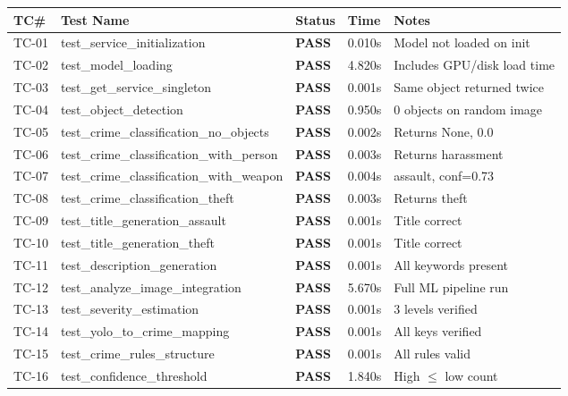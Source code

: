 \documentclass[12pt,a4paper]{report}
\begin{document}
\small
\begin{longtable}{@{}p{0.8cm}p{5cm}p{1.8cm}p{1.8cm}p{4cm}@{}}
\toprule
\textbf{TC\#} & \textbf{Test Name} & \textbf{Status} & \textbf{Time} & \textbf{Notes} \\
\midrule
\endhead
TC-01 & test\_service\_initialization & \textcolor{codegreen}{\textbf{PASS}} & 0.010s & Model not loaded on init \\
TC-02 & test\_model\_loading & \textcolor{codegreen}{\textbf{PASS}} & 4.820s & Includes GPU/disk load time \\
TC-03 & test\_get\_service\_singleton & \textcolor{codegreen}{\textbf{PASS}} & 0.001s & Same object returned twice \\
TC-04 & test\_object\_detection & \textcolor{codegreen}{\textbf{PASS}} & 0.950s & 0 objects on random image \\
TC-05 & test\_crime\_classification\_no\_objects & \textcolor{codegreen}{\textbf{PASS}} & 0.002s & Returns None, 0.0 \\
TC-06 & test\_crime\_classification\_with\_person & \textcolor{codegreen}{\textbf{PASS}} & 0.003s & Returns harassment \\
TC-07 & test\_crime\_classification\_with\_weapon & \textcolor{codegreen}{\textbf{PASS}} & 0.004s & assault, conf=0.73 \\
TC-08 & test\_crime\_classification\_theft & \textcolor{codegreen}{\textbf{PASS}} & 0.003s & Returns theft \\
TC-09 & test\_title\_generation\_assault & \textcolor{codegreen}{\textbf{PASS}} & 0.001s & Title correct \\
TC-10 & test\_title\_generation\_theft & \textcolor{codegreen}{\textbf{PASS}} & 0.001s & Title correct \\
TC-11 & test\_description\_generation & \textcolor{codegreen}{\textbf{PASS}} & 0.001s & All keywords present \\
TC-12 & test\_analyze\_image\_integration & \textcolor{codegreen}{\textbf{PASS}} & 5.670s & Full ML pipeline run \\
TC-13 & test\_severity\_estimation & \textcolor{codegreen}{\textbf{PASS}} & 0.001s & 3 levels verified \\
TC-14 & test\_yolo\_to\_crime\_mapping & \textcolor{codegreen}{\textbf{PASS}} & 0.001s & All keys verified \\
TC-15 & test\_crime\_rules\_structure & \textcolor{codegreen}{\textbf{PASS}} & 0.001s & All rules valid \\
TC-16 & test\_confidence\_threshold & \textcolor{codegreen}{\textbf{PASS}} & 1.840s & High $\leq$ low count \\

\end{longtable}
\end{document}
